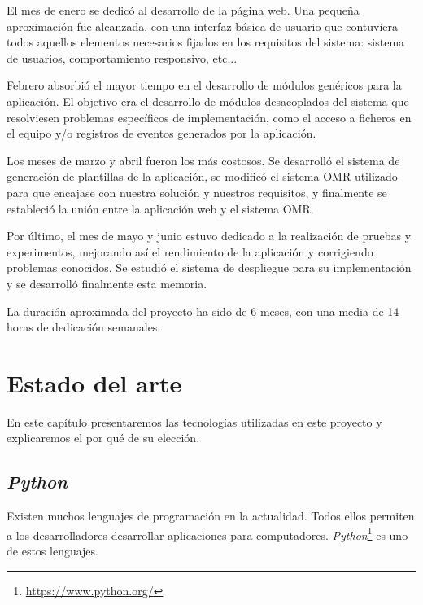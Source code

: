\documentclass[a4paper, 12pt]{book}
\begin{document}
El mes de enero se dedicó al desarrollo de la página web. Una pequeña
aproximación fue alcanzada, con una interfaz básica de usuario que
contuviera todos aquellos elementos necesarios fijados en los requisitos
del sistema: sistema de usuarios, comportamiento responsivo, etc...

Febrero absorbió el mayor tiempo en el desarrollo de módulos genéricos
para la aplicación. El objetivo era el desarrollo de módulos desacoplados
del sistema que resolviesen
problemas específicos de implementación, como el acceso a ficheros
en el equipo y/o registros de eventos generados por la aplicación.

Los meses de marzo y abril fueron los más costosos. Se desarrolló el
sistema de generación de plantillas de la aplicación, se modificó el
sistema OMR utilizado para que encajase con nuestra solución y nuestros
requisitos, y finalmente se estableció la unión entre la aplicación web
y el sistema OMR.

Por último, el mes de mayo y junio estuvo dedicado a la realización de
pruebas y experimentos, mejorando así el rendimiento de la aplicación y 
corrigiendo problemas conocidos. Se estudió el sistema de despliegue para
su implementación y se desarrolló finalmente esta memoria.

La duración aproximada del proyecto ha sido de 6 meses, con una media
de 14 horas de dedicación semanales.




\cleardoublepage
\chapter{Estado del arte}
\label{chap:estado}

En este capítulo presentaremos las tecnologías utilizadas en este proyecto
y explicaremos el por qué de su elección.

\section{\textit{Python}} 
\label{sec:python}

Existen muchos lenguajes de programación en la actualidad. Todos ellos permiten
a los desarrolladores desarrollar aplicaciones para computadores.
\textit{Python}\footnote{\url{https://www.python.org/}} es uno de estos lenguajes.
\end{document}
